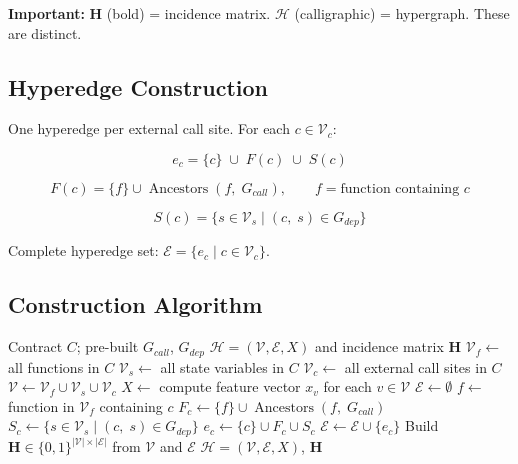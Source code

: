 \documentclass[11pt]{article}
\begin{document}
\textbf{Important:} $\mathbf{H}$ (bold) = incidence matrix. $\mathcal{H}$ (calligraphic) = hypergraph. These are distinct.

\subsection{Hyperedge Construction}
\label{sec:hyperedge}

One hyperedge per external call site. For each $c \in \mathcal{V}_c$:

\[
e_c = \{c\} \;\cup\; F(c) \;\cup\; S(c)
\]

\[
F(c) = \{f\} \cup \operatorname{Ancestors}(f,\; G_{call}), \qquad f = \text{function containing } c
\]

\[
S(c) = \{s \in \mathcal{V}_s \mid (c,\; s) \in G_{dep}\}
\]

Complete hyperedge set: $\mathcal{E} = \{e_c \mid c \in \mathcal{V}_c\}$.

\subsection{Construction Algorithm}

\begin{algorithm}[H]
\caption{Transaction-Centric Hypergraph Construction}
\begin{algorithmic}[1]
\Require Contract $C$; pre-built $G_{call}$, $G_{dep}$
\Ensure $\mathcal{H} = (\mathcal{V}, \mathcal{E}, X)$ and incidence matrix $\mathbf{H}$
\State $\mathcal{V}_f \leftarrow$ all functions in $C$
\State $\mathcal{V}_s \leftarrow$ all state variables in $C$
\State $\mathcal{V}_c \leftarrow$ all external call sites in $C$
\State $\mathcal{V} \leftarrow \mathcal{V}_f \cup \mathcal{V}_s \cup \mathcal{V}_c$
\State $X \leftarrow$ compute feature vector $x_v$ for each $v \in \mathcal{V}$
\State $\mathcal{E} \leftarrow \emptyset$
    \State $f \leftarrow$ function in $\mathcal{V}_f$ containing $c$
    \State $F_c \leftarrow \{f\} \cup \operatorname{Ancestors}(f,\; G_{call})$
    \State $S_c \leftarrow \{s \in \mathcal{V}_s \mid (c,\; s) \in G_{dep}\}$
    \State $e_c \leftarrow \{c\} \cup F_c \cup S_c$
    \State $\mathcal{E} \leftarrow \mathcal{E} \cup \{e_c\}$
\EndFor
\State Build $\mathbf{H} \in \{0,1\}^{|\mathcal{V}| \times |\mathcal{E}|}$ from $\mathcal{V}$ and $\mathcal{E}$
\State \Return $\mathcal{H} = (\mathcal{V}, \mathcal{E}, X)$, $\mathbf{H}$
\end{algorithmic}
\end{algorithm}
\end{document}
